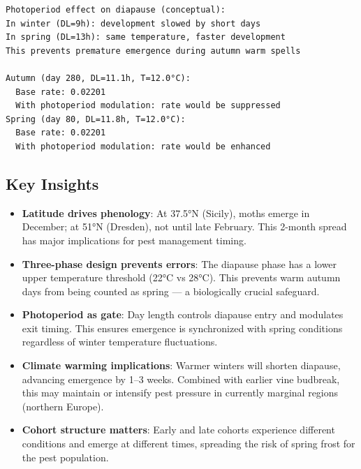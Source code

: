 \begin{verbatim}
Photoperiod effect on diapause (conceptual):
In winter (DL=9h): development slowed by short days
In spring (DL=13h): same temperature, faster development
This prevents premature emergence during autumn warm spells

Autumn (day 280, DL=11.1h, T=12.0°C):
  Base rate: 0.02201
  With photoperiod modulation: rate would be suppressed
Spring (day 80, DL=11.8h, T=12.0°C):
  Base rate: 0.02201
  With photoperiod modulation: rate would be enhanced
\end{verbatim}



\subsection{Key Insights}



\label{7549919537174593161}{}


\begin{itemize}
\item[1. ] \textbf{Latitude drives phenology}: At 37.5°N (Sicily), moths emerge in  December; at 51°N (Dresden), not until late February. This 2-month  spread has major implications for pest management timing.


\item[2. ] \textbf{Three-phase design prevents errors}: The diapause phase has a  lower upper temperature threshold (22°C vs 28°C). This prevents warm  autumn days from being counted as spring — a biologically crucial  safeguard.


\item[3. ] \textbf{Photoperiod as gate}: Day length controls diapause entry and  modulates exit timing. This ensures emergence is synchronized with  spring conditions regardless of winter temperature fluctuations.


\item[4. ] \textbf{Climate warming implications}: Warmer winters will shorten  diapause, advancing emergence by 1–3 weeks. Combined with earlier  vine budbreak, this may maintain or intensify pest pressure in  currently marginal regions (northern Europe).


\item[5. ] \textbf{Cohort structure matters}: Early and late cohorts experience  different conditions and emerge at different times, spreading the  risk of spring frost for the pest population.

\end{itemize}


